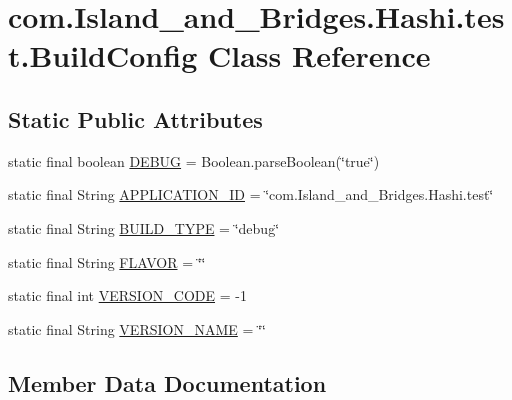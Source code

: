 \hypertarget{classcom_1_1_island__and___bridges_1_1_hashi_1_1test_1_1_build_config}{}\section{com.\+Island\+\_\+and\+\_\+\+Bridges.\+Hashi.\+test.\+Build\+Config Class Reference}
\label{classcom_1_1_island__and___bridges_1_1_hashi_1_1test_1_1_build_config}
\subsection*{Static Public Attributes}
\begin{DoxyCompactItemize}
\item 
static final boolean \mbox{\hyperlink{classcom_1_1_island__and___bridges_1_1_hashi_1_1test_1_1_build_config_a794d8ae987d4d20ace939bf8f2119a80}{D\+E\+B\+UG}} = Boolean.\+parse\+Boolean(\char`\"{}true\char`\"{})
\item 
static final String \mbox{\hyperlink{classcom_1_1_island__and___bridges_1_1_hashi_1_1test_1_1_build_config_a6e08e8f2aef8992516259e76472773ad}{A\+P\+P\+L\+I\+C\+A\+T\+I\+O\+N\+\_\+\+ID}} = \char`\"{}com.\+Island\+\_\+and\+\_\+\+Bridges.\+Hashi.\+test\char`\"{}
\item 
static final String \mbox{\hyperlink{classcom_1_1_island__and___bridges_1_1_hashi_1_1test_1_1_build_config_a10e7107ab8e0764923972eac0fc78a3a}{B\+U\+I\+L\+D\+\_\+\+T\+Y\+PE}} = \char`\"{}debug\char`\"{}
\item 
static final String \mbox{\hyperlink{classcom_1_1_island__and___bridges_1_1_hashi_1_1test_1_1_build_config_a48a3f92e171a105591d78540e45f082b}{F\+L\+A\+V\+OR}} = \char`\"{}\char`\"{}
\item 
static final int \mbox{\hyperlink{classcom_1_1_island__and___bridges_1_1_hashi_1_1test_1_1_build_config_ad22ddd75ae50781f1644cea6069da17b}{V\+E\+R\+S\+I\+O\+N\+\_\+\+C\+O\+DE}} = -\/1
\item 
static final String \mbox{\hyperlink{classcom_1_1_island__and___bridges_1_1_hashi_1_1test_1_1_build_config_ad521c96ecf8a4ccfff9efcf0e4825f43}{V\+E\+R\+S\+I\+O\+N\+\_\+\+N\+A\+ME}} = \char`\"{}\char`\"{}
\end{DoxyCompactItemize}


\subsection{Member Data Documentation}
\mbox{\label{classcom_1_1_island__and___bridges_1_1_hashi_1_1test_1_1_build_config_a6e08e8f2aef8992516259e76472773ad}} 
